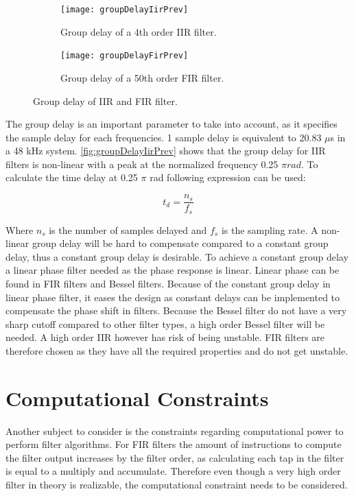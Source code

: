 \begin{figure}[H]
\centering
\begin{subfigure}[t]{0.435\textwidth}
\texttt{[image: groupDelayIirPrev]}
	\caption{Group delay of a 4th order IIR filter.}
	\label{fig:groupDelayIirPrev}
\end{subfigure}
\hspace{6mm} 
\begin{subfigure}[t]{0.47\textwidth}
\texttt{[image: groupDelayFirPrev]}
	\caption{Group delay of a 50th order FIR filter.}
	\label{fig:groupDelayFirPrev}
\end{subfigure}
\caption{Group delay of IIR and FIR filter.}
\label{fig:filterGroupDelay}
\end{figure}

The group delay is an important parameter to take into account, as it specifies the sample delay for each frequencies. 1 sample delay is equivalent to 20.83 $\mu$s in a 48 kHz system. \autoref{fig:groupDelayIirPrev} shows that the group delay for IIR filters is non-linear with a peak at the normalized frequency 0.25 $\pi rad$. To calculate the time delay at 0.25 $\pi$ rad following expression can be used:

\begin{equation}
t_{d}= \frac{n_{s}}{f_s}
\end{equation}

Where $n_{s}$ is the number of samples delayed and $f_s$ is the sampling rate. A non-linear group delay will be hard to compensate compared to a constant group delay, thus a constant group delay is desirable. To achieve a constant group delay a linear phase filter needed as the phase response is linear. Linear phase can be found in FIR filters and Bessel filters. Because of the constant group delay in linear phase filter, it eases the design as constant delays can be implemented to compensate the phase shift in filters. Because the Bessel filter do not have a very sharp cutoff compared to other filter types, a high order Bessel filter will be needed. A high order IIR however has risk of being unstable. FIR filters are therefore chosen as they have all the required properties and do not get unstable.


\section{Computational Constraints}
Another subject to consider is the constraints regarding computational power to perform filter algorithms. For FIR filters the amount of instructions to compute the filter output increases by the filter order, as calculating each tap in the filter is equal to a multiply and accumulate. Therefore even though a very high order filter in theory is realizable, the computational constraint needs to be considered. 

